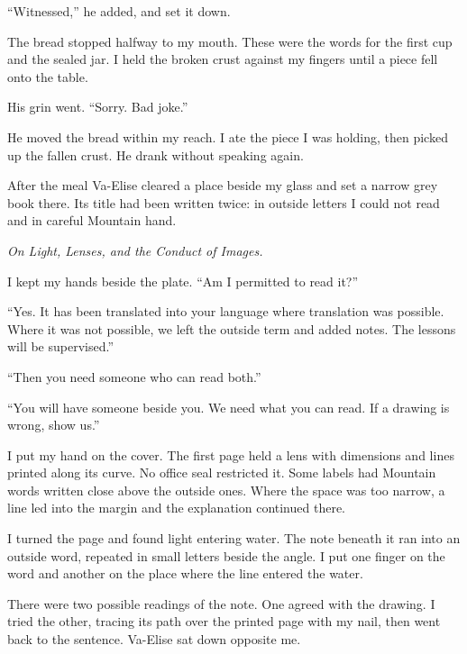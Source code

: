 ``Witnessed,'' he added, and set it down.\par

The bread stopped halfway to my mouth. These were the words for the first cup and the sealed jar. I held the broken crust against my fingers until a piece fell onto the table.\par

His grin went. ``Sorry. Bad joke.''\par

He moved the bread within my reach. I ate the piece I was holding, then picked up the fallen crust. He drank without speaking again.\par

After the meal Va-Elise cleared a place beside my glass and set a narrow grey book there. Its title had been written twice: in outside letters I could not read and in careful Mountain hand.\par

\textit{On Light, Lenses, and the Conduct of Images.}\par

I kept my hands beside the plate. ``Am I permitted to read it?''\par

``Yes. It has been translated into your language where translation was possible. Where it was not possible, we left the outside term and added notes. The lessons will be supervised.''\par

``Then you need someone who can read both.''\par

``You will have someone beside you. We need what you can read. If a drawing is wrong, show us.''\par

I put my hand on the cover. The first page held a lens with dimensions and lines printed along its curve. No office seal restricted it. Some labels had Mountain words written close above the outside ones. Where the space was too narrow, a line led into the margin and the explanation continued there.\par

I turned the page and found light entering water. The note beneath it ran into an outside word, repeated in small letters beside the angle. I put one finger on the word and another on the place where the line entered the water.\par

There were two possible readings of the note. One agreed with the drawing. I tried the other, tracing its path over the printed page with my nail, then went back to the sentence. Va-Elise sat down opposite me.\par

